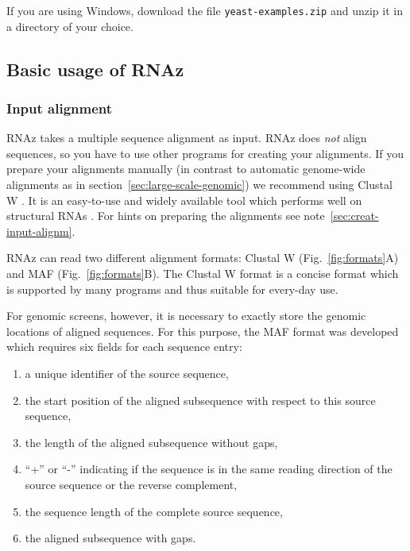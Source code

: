 \documentclass[11pt]{article}
\begin{document}
If you are using Windows, download the file \texttt{yeast-examples.zip} and
unzip it in a directory of your choice.

\subsection{Basic usage of RNAz}

\subsubsection{Input alignment}

RNAz takes a multiple sequence alignment as input. RNAz does \emph{not}
align sequences, so you have to use other programs for creating your
alignments. If you prepare your alignments manually (in contrast to
automatic genome-wide alignments as in
section~\ref{sec:large-scale-genomic}) we recommend using Clustal W
\cite{thompson94}. It is an easy-to-use and widely available tool which
performs well on structural RNAs \cite{gardner05}. For hints on preparing
the alignments see note~\ref{sec:creat-input-alignm}.

RNAz can read two different alignment formats: Clustal W
(Fig.~\ref{fig:formats}A) and MAF (Fig.~\ref{fig:formats}B). The Clustal W
format is a concise format which is supported by many programs and thus
suitable for every-day use.

For genomic screens, however, it is necessary to exactly store the genomic
locations of aligned sequences. For this purpose, the MAF format was
developed which requires six fields for each sequence entry:

\begin{enumerate}

\item a unique identifier of the source sequence,
\item the start position of the aligned subsequence with respect to this
  source sequence,
\item the length of the aligned subsequence without gaps,
\item ``+'' or ``-'' indicating if the sequence is in the same reading
  direction of the source sequence or the reverse complement,
\item the sequence length of the complete source sequence,
\item the aligned subsequence with gaps.

\end{enumerate}
\end{document}
